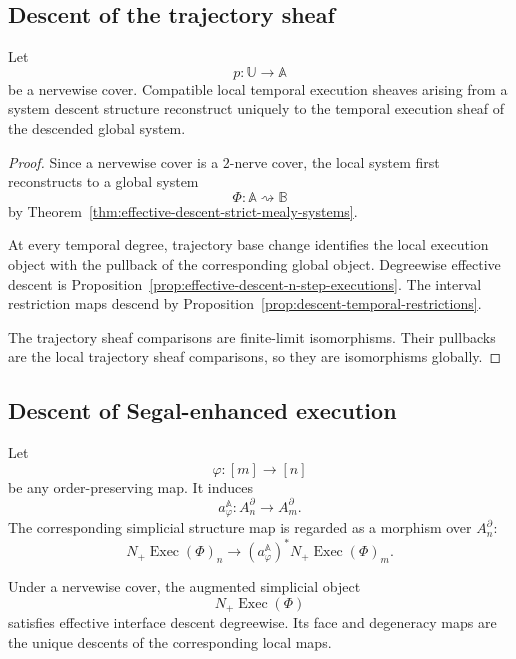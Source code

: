\subsection{Descent of the trajectory sheaf}
\label{subsec:descent-trajectory-sheaf}

\begin{theorem}
\label{thm:effective-interface-descent-temporal-trajectories}
Let
\[
    p:\mathbb U\to\mathbb A
\]
be a nervewise cover. Compatible local temporal execution sheaves arising
from a system descent structure reconstruct uniquely to the temporal
execution sheaf of the descended global system.
\end{theorem}

\begin{proof}
Since a nervewise cover is a \(2\)-nerve cover, the local system first
reconstructs to a global system
\[
    \Phi:\mathbb A\rightsquigarrow\mathbb B
\]
by
Theorem~\ref{thm:effective-descent-strict-mealy-systems}.

At every temporal degree, trajectory base change identifies the local
execution object with the pullback of the corresponding global object.
Degreewise effective descent is
Proposition~\ref{prop:effective-descent-n-step-executions}.
The interval restriction maps descend by
Proposition~\ref{prop:descent-temporal-restrictions}.

The trajectory sheaf comparisons are finite-limit isomorphisms. Their
pullbacks are the local trajectory sheaf comparisons, so they are
isomorphisms globally.
\end{proof}

\subsection{Descent of Segal-enhanced execution}
\label{subsec:descent-segal-enhanced-execution}

Let
\[
    \varphi:[m]\to[n]
\]
be any order-preserving map. It induces
\[
    a_\varphi^{\mathbb A}:
    A_n^\partial\to A_m^\partial.
\]
The corresponding simplicial structure map is regarded as a morphism over
\(A_n^\partial\):
\[
    N_+\operatorname{Exec}(\Phi)_n
    \to
    (a_\varphi^{\mathbb A})^\ast
    N_+\operatorname{Exec}(\Phi)_m.
\]

\begin{theorem}
\label{thm:descent-segal-enhanced-execution}
Under a nervewise cover, the augmented simplicial object
\[
    N_+\operatorname{Exec}(\Phi)
\]
satisfies effective interface descent degreewise. Its face and degeneracy
maps are the unique descents of the corresponding local maps.
\end{theorem}


